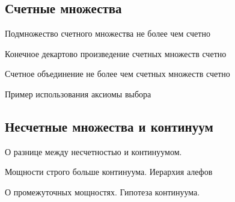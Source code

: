 \documentclass{article}
\begin{document}
\subsection{Счетные множества}
\begin{theorem}
    Подмножество счетного множества не более чем счетно
\end{theorem}
\begin{theorem}
    Конечное декартово произведение счетных множеств счетно
\end{theorem}
\begin{theorem}
    Счетное объединение не более чем счетных множеств счетно
\end{theorem}

Пример использования аксиомы выбора

\subsection{Несчетные множества и континуум}

О разнице между несчетностью и континуумом. 

Мощности строго больше континуума. Иерархия алефов

О промежуточных мощностях. Гипотеза континуума. 
\end{document}
